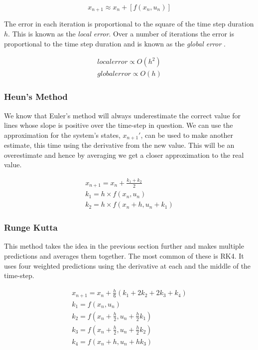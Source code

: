 \documentclass[a4paper,oneside,12pt]{report}
\begin{document}
\begin{equation}
x_{n+1} \approx x_{n} + \left[ f( x_n, u_n ) \right] \label{eqn-euler}
\end{equation}

The error in each iteration is proportional to the square of the time step duration $h$. This is known as the \emph{local error}. Over a number of iterations the error is proportional to the time step duration and is known as the \emph{global error} \cite{Gerald2003}.

\begin{eqnarray}
localerror \propto O(h^2) \label{eqn-localerror}\\
globalerror \propto O(h) \label{eqn-globalerror}
\end{eqnarray}

\subsubsection{Heun's Method}

We know that Euler's method will always underestimate the correct value for lines whose slope is positive over the time-step in question. We can use the approximation for the system's states, $x_{n+1}'$, can be used to make another estimate, this time using the derivative from the new value. This will be an overestimate and hence by averaging we get a closer approximation to the real value.

\begin{eqnarray}
x_{n+1} = x_{n} + \frac{k_1 + k_2 }{2}  \label{eqn-heun} \\
k_1 = h \times f( x_n, u_n )  \label{eqn-heun-k1}\\
k_2 = h \times f\left( x_n + h, u_n + k_1 \right) \label{eqn-heun-k2}
\end{eqnarray}

\subsubsection{Runge Kutta}

This method takes the idea in the previous section further and makes multiple predictions and averages them together. The most common of these is RK4. It uses four weighted predictions using the derivative at each and the middle of the time-step.

\begin{eqnarray}
x_{n+1} = x_{n} + \frac{h}{6} \left( k_1 + 2 k_2 + 2 k_3 + k_4 \right)  \label{eqn-rk4} \\
k_1 = f\left( x_n, u_n  \right)\\
k_2 = f\left( x_n + \frac{h}{2}, u_n + \frac{h}{2} k_1 \right)\\
k_3 = f\left( x_n + \frac{h}{2}, u_n + \frac{h}{2} k_2 \right)\\
k_4 = f\left( x_n + h, u_n + h k_3 \right)
\end{eqnarray}
\end{document}
